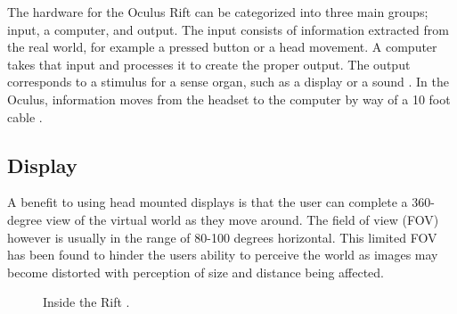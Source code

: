 The hardware for the Oculus Rift can be categorized into three main groups; input, a computer, and output. The input consists of information extracted from the real world, for example a pressed button or a head movement. A computer takes that input and processes it to create the proper output. The output corresponds to a stimulus for a sense organ, such as a display or a sound \cite{LaValle2017}. In the Oculus, information moves from the headset to the computer by way of a 10 foot cable \cite{Sharkey2012}.


\subsection{Display} \label{DisplayChap}
A benefit to using head mounted displays is that the user can complete a 360-degree view of the virtual world as they move around. The field of view (FOV) however is usually in the range of 80-100 degrees horizontal. This limited FOV has been found to hinder the users ability to perceive the world as images may become distorted with perception of size and distance being affected. 
\begin{figure}[!ht]
	\begin{center}
	\end{center}
	\caption{Inside the Rift \cite{RajeshDesai2014}.} \label{fig:insidetheRift}
\end{figure} 


